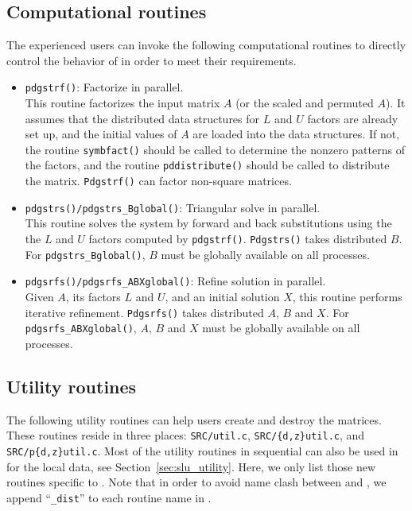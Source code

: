 \subsection{Computational routines}
The experienced users can invoke the following computational routines
to directly control the behavior of {\superlud} in order to meet their
requirements.
\begin{itemize}
\item {\tt pdgstrf()}: Factorize in parallel. \\
	This routine factorizes the input matrix $A$ (or the scaled and
	permuted $A$). It assumes that the distributed data structures
	for $L$ and $U$ factors are already set up, and the initial
  	values of $A$ are loaded into the data structures.
	If not, the routine {\tt symbfact()} should be called to
	determine the nonzero patterns of the factors, and the
	routine {\tt pddistribute()} should be called to distribute the matrix.
	{\tt Pdgstrf()} can factor non-square matrices.
\item {\tt pdgstrs()/pdgstrs\_Bglobal()}: Triangular solve in parallel. \\
	This routine solves the system by forward and back
	substitutions using the the $L$ and $U$ factors
	computed by {\tt pdgstrf()}. {\tt Pdgstrs()} takes distributed $B$.
	For {\tt pdgstrs\_Bglobal()}, $B$ must be globally available on
        all processes. 
\item {\tt pdgsrfs()/pdgsrfs\_ABXglobal()}: Refine solution in parallel. \\
	Given $A$, its factors $L$ and $U$, and an initial solution
	$X$, this routine performs iterative refinement.
	{\tt Pdgsrfs()} takes distributed $A$, $B$ and $X$.
	For {\tt pdgsrfs\_ABXglobal()}, $A$, $B$ and $X$ must be globally
        available on all processes. 
\end{itemize}

\subsection{Utility routines}
\label{sec:slud_utility}

The following utility routines can help users create and destroy the
{\superlud} matrices. These routines reside in three places: {\tt SRC/util.c},
{\tt SRC/\{d,z\}util.c}, and {\tt SRC/p\{d,z\}util.c}.
Most of the utility routines in sequential {\superlu} can also be used
in {\superlud} for the local data, see Section~\ref{sec:slu_utility}.
Here, we only list those new routines
specific to {\superlud}. Note that in order to avoid name clash between
{\superlu} and {\superlud}, we append ``{\tt \_dist}'' to each routine
name in {\superlud}.

